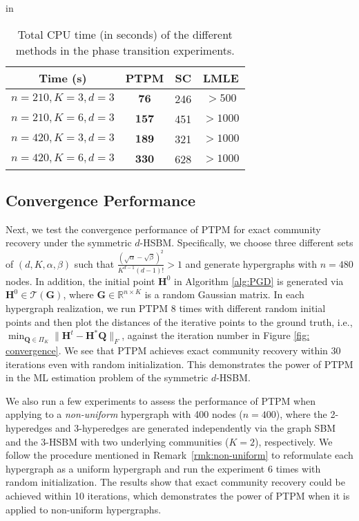 \documentclass{article}
\theoremstyle{plain}
\theoremstyle{definition}
\theoremstyle{remark}
\newcommand{\BH}{\bm{H}}
\newcommand{\BQ}{\bm{Q}}
\newcommand{\TCal}{\mathcal{T}}
\begin{document}
\begin{table}[htbp]
	\centering
		\caption{Total CPU time (in seconds) of the different methods in the phase transition experiments.}
   in
	\begin{tabular}{cccc}
		\hline Time (s) & PTPM & SC & LMLE \\
		\hline$n=210, K=3,d=3$ & $\mathbf{76}$ & 246 & $>500$ \\
        \hline$n=210, K=6,d=3$ & $\mathbf{157}$ & 451 & $>1000$ \\
    \hline$n=420, K=3,d=3$ & $\textbf{189}$ & 321 & $>1000$ \\
      \hline$n=420, K=6,d=3$ & $\textbf{330}$ & 628 & $>1000$ \\
		\hline
	\end{tabular}
	\label{tab: cputime}
\end{table}



\subsection{Convergence Performance}
Next, we test the convergence performance of PTPM for exact community recovery under the symmetric $d$-HSBM. Specifically, we choose three different sets of $(d,K, \alpha,\beta)$ such that $\frac{(\sqrt{\alpha} - \sqrt{\beta})^2}{K^{d-1}(d-1)!} >1$ and generate hypergraphs with $n=480$ nodes. In addition, the initial point $\BH^0$ in Algorithm \ref{alg:PGD} is generated via $\BH^0 \in \TCal(\bm{G})$, where $\bm{G} \in \mathbb{R}^{n\times K}$ is a random Gaussian matrix. In each hypergraph realization, we run PTPM 8 times with different random initial points and then plot the distances of the iterative points to the ground truth, i.e., $\min_{\BQ \in \Pi_K}\|\BH^t-\BH^*\BQ\|_F$, against the iteration number in Figure \ref{fig: convergence}. We see that PTPM achieves exact community recovery within 30 iterations even with random initialization. This demonstrates the power of PTPM in the ML estimation problem of the symmetric $d$-HSBM.

We also run a few experiments to assess the performance of PTPM when applying to a \emph{non-uniform} hypergraph with 400 nodes ($n=400$), where the 2-hyperedges and 3-hyperedges are generated independently via the graph SBM and the 3-HSBM with two underlying communities ($K=2$), respectively. We follow the procedure mentioned in Remark~\ref{rmk:non-uniform} to reformulate each hypergraph as a uniform hypergraph and run the experiment 6 times with random initialization. The results show that exact community recovery could be achieved within 10 iterations, which demonstrates the power of PTPM when it is applied to non-uniform hypergraphs. %
\end{document}
